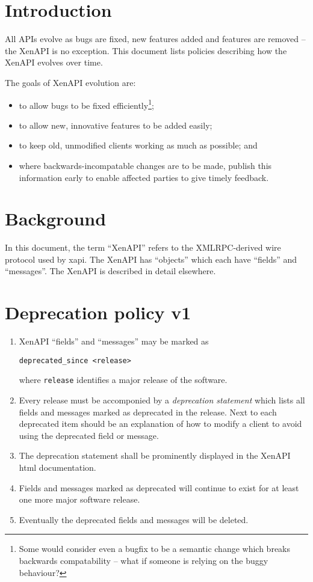 \documentclass{article}
\begin{document}



\section{Introduction}
All APIs evolve as bugs are fixed, new features added and features are removed -- the XenAPI is no exception. This document lists policies describing how the XenAPI evolves over time.

The goals of XenAPI evolution are:
\begin{itemize}
\item to allow bugs to be fixed efficiently\footnote{Some would consider even a bugfix to be a semantic change which breaks backwards compatability -- what if someone is relying on the buggy behaviour?};
\item to allow new, innovative features to be added easily;
\item to keep old, unmodified clients working as much as possible; and
\item where backwards-incompatable changes are to be made, publish this information early to enable affected parties to give timely feedback.
\end{itemize}

\section{Background}
In this document, the term ``XenAPI'' refers to the XMLRPC-derived wire protocol used by xapi. The XenAPI has ``objects'' which each have ``fields'' and ``messages''. The XenAPI is described in detail elsewhere.

\section{Deprecation policy v1}
\begin{enumerate}

\item XenAPI ``fields'' and ``messages'' may be marked as
\begin{verbatim}
deprecated_since <release>
\end{verbatim}
where \texttt{release} identifies a major release of the software.

\item Every release must be accomponied by a {\em deprecation statement} which lists all fields and messages marked as deprecated in the release. Next to each deprecated item should be an explanation of how to modify a client to avoid using the deprecated field or message.

\item The deprecation statement shall be prominently displayed in the XenAPI html documentation.

\item Fields and messages marked as deprecated will continue to exist for at least one more major software release.

\item Eventually the deprecated fields and messages will be deleted.
\end{enumerate}
\end{document}
